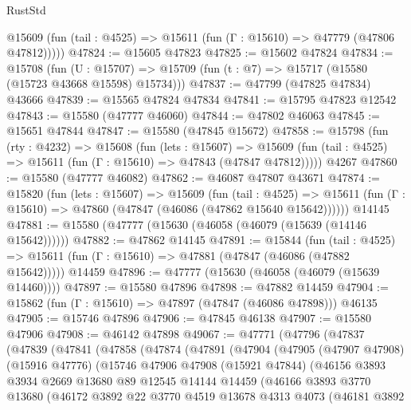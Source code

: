 \begin{lexlean}{RustStd}
\begin{coremodule}
      @15609 (fun (tail : @4525) => @15611 (fun (Γ : @15610) => @47779 (@47806 @47812)))))
@47824 := @15605 @47823
@47825 := @15602 @47824
@47834 := @15708
    (fun (U : @15707) => @15709 (fun (t : @7) => @15717 (@15580 (@15723 @43668 @15598) @15734)))
@47837 := @47799 (@47825 @47834) @43666
@47839 := @15565 @47824 @47834
@47841 := @15795 @47823 @12542
@47843 := @15580 (@47777 @46060)
@47844 := @47802 @46063
@47845 := @15651 @47844
@47847 := @15580 (@47845 @15672)
@47858 := @15798
    (fun (rty : @4232) =>
    @15608
      (fun (lets : @15607) =>
      @15609 (fun (tail : @4525) => @15611 (fun (Γ : @15610) => @47843 (@47847 @47812)))))
    @4267
@47860 := @15580 (@47777 @46082)
@47862 := @46087 @47807 @43671
@47874 := @15820
    (fun (lets : @15607) =>
    @15609
      (fun (tail : @4525) =>
      @15611 (fun (Γ : @15610) => @47860 (@47847 (@46086 (@47862 @15640 @15642))))))
    @14145
@47881 := @15580 (@47777 (@15630 (@46058 (@46079 (@15639 (@14146 @15642))))))
@47882 := @47862 @14145
@47891 := @15844
    (fun (tail : @4525) => @15611 (fun (Γ : @15610) => @47881 (@47847 (@46086 (@47882 @15642)))))
    @14459
@47896 := @47777 (@15630 (@46058 (@46079 (@15639 @14460))))
@47897 := @15580 @47896
@47898 := @47882 @14459
@47904 := @15862 (fun (Γ : @15610) => @47897 (@47847 (@46086 @47898))) @46135
@47905 := @15746 @47896
@47906 := @47845 @46138
@47907 := @15580 @47906
@47908 := @46142 @47898
@49067 := @47771
    (@47796
      (@47837
        (@47839
          (@47841
            (@47858
              (@47874
                (@47891
                  (@47904
                    (@47905
                      (@47907 @47908)
                      (@15916 @47776)
                      (@15746
                        @47906
                        @47908
                        (@15921 @47844)
                        (@46156
                          @3893
                          @3934
                          @2669
                          @13680
                          @89
                          @12545
                          @14144
                          @14459
                          (@46166
                            @3893
                            @3770
                            @13680
                            (@46172
                              @3892
                              @22
                              @3770
                              @4519
                              @13678
                              @4313
                              @4073
                              (@46181
                                @3892

\end{coremodule}
\end{lexlean}
